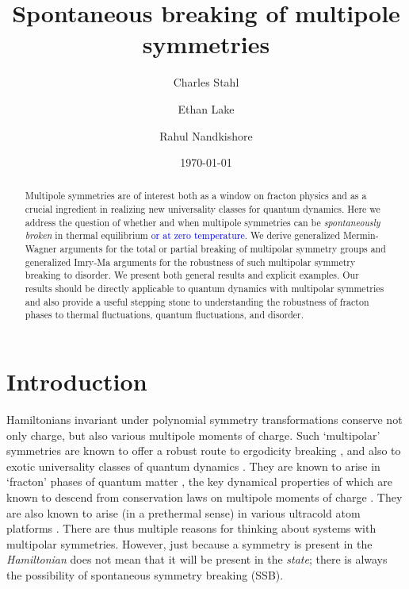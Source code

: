 \documentclass[pra,aps,twocolumn, amsfonts,amsmath,amssymb,nofootinbib,superscriptaddress]{revtex4-2}
\newcommand{\charlie}[1]{\textcolor{Blue}{#1}}
\begin{document}
	
\title{Spontaneous breaking of multipole symmetries}
\author{Charles Stahl}
\author{Ethan Lake}
\author{Rahul Nandkishore}


	
\begin{abstract}
Multipole symmetries are of interest both as a window on fracton physics and as a crucial ingredient in realizing new universality classes for quantum dynamics. Here we address the question of whether and when multipole symmetries can be {\it spontaneously broken} in thermal equilibrium \charlie{or at zero temperature}. We derive generalized Mermin-Wagner arguments for the total or partial breaking of multipolar symmetry groups and generalized Imry-Ma arguments for the robustness of such multipolar symmetry breaking to disorder. We present both general results and explicit examples. Our results should be directly applicable to quantum dynamics with multipolar symmetries and also provide a useful stepping stone to understanding the robustness of fracton phases to thermal fluctuations, quantum fluctuations, and disorder. 
\end{abstract}
	
\date{\today}
	
\maketitle

\section{Introduction}

Hamiltonians invariant under polynomial symmetry transformations conserve not only charge, but also various multipole moments of charge. Such `multipolar' symmetries are known to offer a robust route to ergodicity breaking \cite{PPN, KHN, Sala, Moudgalya, SLIOM, commutant}, and also to exotic universality classes of quantum dynamics \cite{Iaconis1, GLN, nonabelian, glorioso, MKH, Feldmeier, Iaconis2}. They are known to arise in `fracton' phases of quantum matter \cite{Chamon, Haah, VHF1, VHF2, NH, PretkoRadzihovsky}, the key dynamical properties of which are known to descend from conservation laws on multipole moments of charge \cite{Pretko1, BB,  Gromov2019}. They are also known to arise (in a prethermal sense) in various ultracold atom platforms \cite{KHN, Bakr, Aidelsburger}. There are thus multiple reasons for thinking about systems with multipolar symmetries. However, just because a symmetry is present in the {\it Hamiltonian} does not mean that it will be present in the {\it state}; there is always the possibility of spontaneous symmetry breaking (SSB). 
\end{document}
